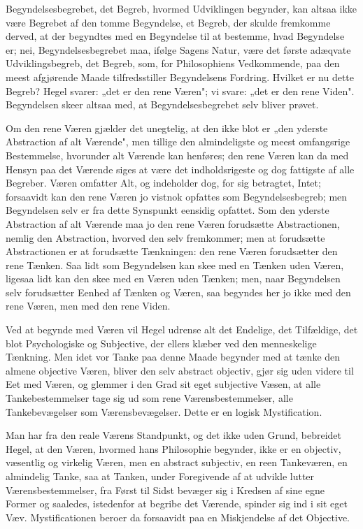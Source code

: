 \documentclass[12pt]{book}
\newcommand{\opage}[1]{\marginnote{\footnotesize\textit{[#1]}}}
\begin{document}
Begyndelsesbegrebet, det Begreb, hvormed Udviklingen begynder, kan altsaa ikke være
Begrebet af den tomme Begyndelse, et Begreb, der skulde fremkomme derved, at der
begyndtes med en Begyndelse til at bestemme, hvad Begyndelse er; nei,
Begyndelsesbegrebet maa, ifølge Sagens Natur, være det første adæqvate
Udviklingsbegreb, det Begreb, som, for Philosophiens Vedkommende, paa den meest
afgjørende Maade tilfredsstiller Begyndelsens Fordring. Hvilket er nu dette Begreb?
Hegel svarer: „det er den rene Væren"; vi svare: „det er den rene Viden".
Begyndelsen skeer altsaa med, at Begyndelsesbegrebet selv bliver prøvet.

Om den rene Væren gjælder det unegtelig, at den ikke blot er „den yderste
Abstraction af alt Værende", men tillige den almindeligste og meest omfangsrige
Bestemmelse, hvorunder alt Værende kan henføres; den rene Væren kan da med Hensyn
paa det Værende siges at være det indholdsrigeste og dog fattigste af alle Begreber.
Væren omfatter Alt, og indeholder dog, for sig betragtet, Intet; forsaavidt
\opage{3} kan den rene Væren jo vistnok opfattes som Begyndelsesbegreb; men Begyndelsen selv
er fra dette Synspunkt eensidig opfattet. Som den yderste Abstraction af alt Værende
maa jo den rene Væren forudsætte Abstractionen, nemlig den Abstraction, hvorved den
selv fremkommer; men at forudsætte Abstractionen er at forudsætte Tænkningen: den
rene Væren forudsætter den rene Tænken. Saa lidt som Begyndelsen kan skee med en
Tænken uden Væren, ligesaa lidt kan den skee med en Væren uden Tænken; men, naar
Begyndelsen selv forudsætter Eenhed af Tænken og Væren, saa begyndes her jo ikke med
den rene Væren, men med den rene Viden.

Ved at begynde med Væren vil Hegel udrense alt det Endelige, det Tilfældige, det
blot Psychologiske og Subjective, der ellers klæber ved den menneskelige Tænkning.
Men idet vor Tanke paa denne Maade begynder med at tænke den almene objective Væren,
bliver den selv abstract objectiv, gjør sig uden videre til Eet med Væren, og
glemmer i den Grad sit eget subjective Væsen, at alle Tankebestemmelser tage sig ud
som rene Værensbestemmelser, alle Tankebevægelser som Værensbevægelser. Dette er en
logisk Mystification.

Man har fra den reale Værens Standpunkt, og det ikke uden Grund, bebreidet Hegel, at
den Væren, hvormed hans Philosophie begynder, ikke er en objectiv, væsentlig og
virkelig Væren, men en abstract subjectiv, en reen Tankeværen, en almindelig Tanke,
saa at Tanken, under Foregivende af at udvikle lutter Værensbestemmelser, fra Først
til Sidst bevæger sig i Kredsen af sine egne Former og saaledes, istedenfor at
begribe det Værende, spinder sig ind i sit eget Væv. Mystificationen beroer da
forsaavidt paa en Miskjendelse af det Objective.
\end{document}
